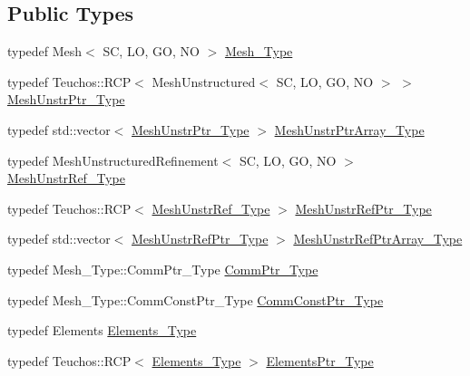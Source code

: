 \subsection*{Public Types}
\begin{DoxyCompactItemize}
\item 
typedef Mesh$<$ SC, LO, GO, NO $>$ \hyperlink{classFEDD_1_1RefinementFactory_a19f6ea9d9d873657041004fa12f76ac5}{Mesh\+\_\+\+Type}
\item 
typedef Teuchos\+::\+R\+CP$<$ Mesh\+Unstructured$<$ SC, LO, GO, NO $>$ $>$ \hyperlink{classFEDD_1_1RefinementFactory_a1a278d01c278972af01f2996247af8ac}{Mesh\+Unstr\+Ptr\+\_\+\+Type}
\item 
typedef std\+::vector$<$ \hyperlink{classFEDD_1_1RefinementFactory_a1a278d01c278972af01f2996247af8ac}{Mesh\+Unstr\+Ptr\+\_\+\+Type} $>$ \hyperlink{classFEDD_1_1RefinementFactory_a772a738296d703be721b9b1c877f1a9e}{Mesh\+Unstr\+Ptr\+Array\+\_\+\+Type}
\item 
typedef Mesh\+Unstructured\+Refinement$<$ SC, LO, GO, NO $>$ \hyperlink{classFEDD_1_1RefinementFactory_a22aea92d236fb822fef9557c22834062}{Mesh\+Unstr\+Ref\+\_\+\+Type}
\item 
typedef Teuchos\+::\+R\+CP$<$ \hyperlink{classFEDD_1_1RefinementFactory_a22aea92d236fb822fef9557c22834062}{Mesh\+Unstr\+Ref\+\_\+\+Type} $>$ \hyperlink{classFEDD_1_1RefinementFactory_aea0fab96821387bc772333299102b2c9}{Mesh\+Unstr\+Ref\+Ptr\+\_\+\+Type}
\item 
typedef std\+::vector$<$ \hyperlink{classFEDD_1_1RefinementFactory_aea0fab96821387bc772333299102b2c9}{Mesh\+Unstr\+Ref\+Ptr\+\_\+\+Type} $>$ \hyperlink{classFEDD_1_1RefinementFactory_af6e25bbcc6f5e8d6ee70a1c5aab1e3eb}{Mesh\+Unstr\+Ref\+Ptr\+Array\+\_\+\+Type}
\item 
typedef Mesh\+\_\+\+Type\+::\+Comm\+Ptr\+\_\+\+Type \hyperlink{classFEDD_1_1RefinementFactory_ad2163b2c380d83b6b28a695f6f8e8a56}{Comm\+Ptr\+\_\+\+Type}
\item 
typedef Mesh\+\_\+\+Type\+::\+Comm\+Const\+Ptr\+\_\+\+Type \hyperlink{classFEDD_1_1RefinementFactory_a58381e0786c65ec61d11bc73c224b45a}{Comm\+Const\+Ptr\+\_\+\+Type}
\item 
typedef Elements \hyperlink{classFEDD_1_1RefinementFactory_a0879b04ac1b1830fae7d6a7e29d36000}{Elements\+\_\+\+Type}
\item 
typedef Teuchos\+::\+R\+CP$<$ \hyperlink{classFEDD_1_1RefinementFactory_a0879b04ac1b1830fae7d6a7e29d36000}{Elements\+\_\+\+Type} $>$ \hyperlink{classFEDD_1_1RefinementFactory_a0994b5b7b6d080048673941251999f2e}{Elements\+Ptr\+\_\+\+Type}

\end{DoxyCompactItemize}

